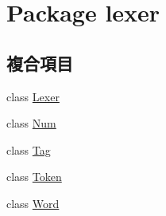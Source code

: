 \hypertarget{namespacelexer}{}\section{Package lexer}
\label{namespacelexer}
\subsection*{複合項目}
\begin{DoxyCompactItemize}
\item 
class \hyperlink{classlexer_1_1_lexer}{Lexer}
\item 
class \hyperlink{classlexer_1_1_num}{Num}
\item 
class \hyperlink{classlexer_1_1_tag}{Tag}
\item 
class \hyperlink{classlexer_1_1_token}{Token}
\item 
class \hyperlink{classlexer_1_1_word}{Word}
\end{DoxyCompactItemize}
